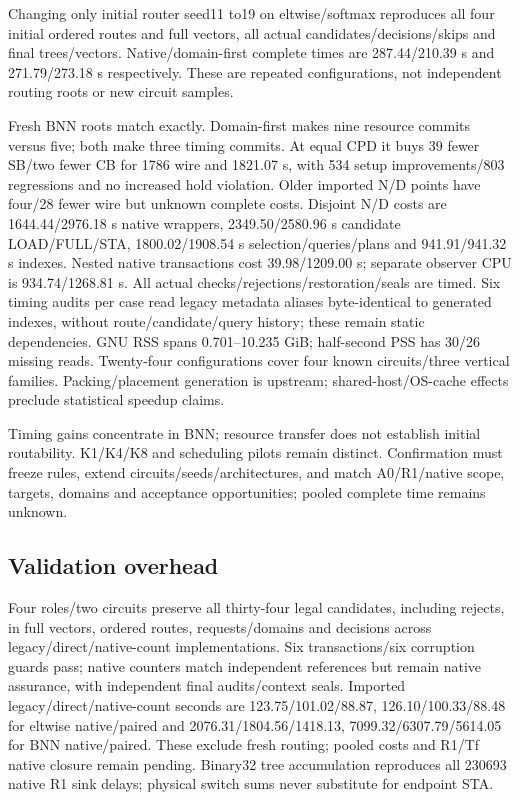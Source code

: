 \documentclass[conference,10pt]{IEEEtran}
\begin{document}
Changing only initial router seed11 to19 on eltwise/softmax reproduces all four initial ordered routes and full vectors, all actual candidates/decisions/skips and final trees/vectors. Native/domain-first complete times are 287.44/210.39 s and 271.79/273.18 s respectively. These are repeated configurations, not independent routing roots or new circuit samples.

Fresh BNN roots match exactly. Domain-first makes nine resource commits versus five; both make three timing commits. At equal CPD it buys 39 fewer SB/two fewer CB for 1786 wire and 1821.07 s, with 534 setup improvements/803 regressions and no increased hold violation. Older imported N/D points have four/28 fewer wire but unknown complete costs. Disjoint N/D costs are 1644.44/2976.18 s native wrappers, 2349.50/2580.96 s candidate LOAD/FULL/STA, 1800.02/1908.54 s selection/queries/plans and 941.91/941.32 s indexes. Nested native transactions cost 39.98/1209.00 s; separate observer CPU is 934.74/1268.81 s. All actual checks/rejections/restoration/seals are timed. Six timing audits per case read legacy metadata aliases byte-identical to generated indexes, without route/candidate/query history; these remain static dependencies. GNU RSS spans 0.701--10.235 GiB; half-second PSS has 30/26 missing reads. Twenty-four configurations cover four known circuits/three vertical families. Packing/placement generation is upstream; shared-host/OS-cache effects preclude statistical speedup claims.

Timing gains concentrate in BNN; resource transfer does not establish initial routability. K1/K4/K8 and scheduling pilots remain distinct. Confirmation must freeze rules, extend circuits/seeds/architectures, and match A0/R1/native scope, targets, domains and acceptance opportunities; pooled complete time remains unknown.

\subsection{Validation overhead}
Four roles/two circuits preserve all thirty-four legal candidates, including rejects, in full vectors, ordered routes, requests/domains and decisions across legacy/direct/native-count implementations. Six transactions/six corruption guards pass; native counters match independent references but remain native assurance, with independent final audits/context seals. Imported legacy/direct/native-count seconds are 123.75/101.02/88.87, 126.10/100.33/88.48 for eltwise native/paired and 2076.31/1804.56/1418.13, 7099.32/6307.79/5614.05 for BNN native/paired. These exclude fresh routing; pooled costs and R1/Tf native closure remain pending. Binary32 tree accumulation reproduces all 230693 native R1 sink delays; physical switch sums never substitute for endpoint STA.
\end{document}
